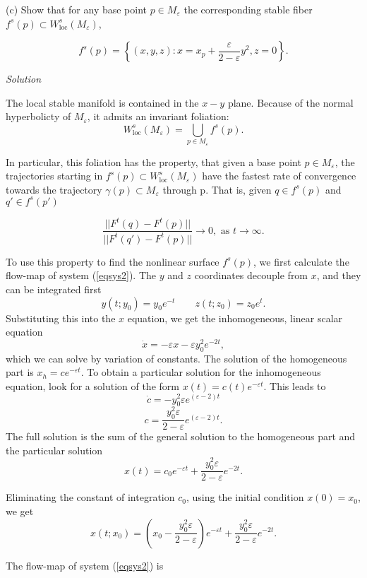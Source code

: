 \documentclass[a4paper,11pt,pdftex]{article}
\begin{document}
(c) Show that for any base point $p\in M_\varepsilon $ the corresponding stable fiber $f^s(p)\subset W^s_{\text{loc}}(M_\varepsilon)$, 

$$
f^s(p) = \left\{ (x,y,z): x = x_p+ \frac{\varepsilon}{2-\varepsilon}y^2, z=0 \right\}.
$$


\emph{Solution}

The local stable manifold is contained in the $x-y$ plane. Because of the normal hyperbolicty of $M_\varepsilon$, it admits an invariant foliation:
$$
W^s_{\text{loc}}(M_\varepsilon) = \bigcup_{p\in M_\varepsilon} f^s(p).
$$

In particular, this foliation has the property, that given a base point $p\in M_\varepsilon$, the trajectories starting in $f^s(p)\subset W^s_{\text{loc}}(M_\varepsilon) $ have the fastest rate of convergence towards the trajectory $\gamma(p)\subset M_\varepsilon$ through p. That is, given $q\in f^s(p)$ and $q'\in f^s(p')$

\begin{equation}
\label{conds}
    \frac{||F^t(q) - F^t(p)||}{||F^t(q') - F^t(p)||}\to 0, \text{ as } t\to \infty.
\end{equation}

To use this property to find the nonlinear surface $f^s(p)$, we first calculate the flow-map of system (\ref{eqsys2}). The $y$ and $z$ coordinates decouple from $x$, and they can be integrated first
$$
y(t;y_0) = y_0e^{-t} \qquad z(t;z_0) = z_0e^{t}.
$$
Substituting this into the $x$ equation, we get the inhomogeneous, linear scalar equation
$$
    \dot{x} = -\varepsilon x - \varepsilon y_0^2 e^{-2t}, 
$$
which we can solve by variation of constants. The solution of the homogeneous part is $x_h = ce^{-\varepsilon t}$. To obtain a particular solution for the inhomogeneous equation, look for a solution of the form $x(t)=c(t)e^{-\varepsilon t}$. This leads to
$$
\dot{c} = -y_0^2\varepsilon e^{(\varepsilon-2)t}
$$
$$
c = \frac{y_0^2 \varepsilon }{2-\varepsilon}e^{(\varepsilon-2)t}.
$$
The full solution is the sum of the general solution to the homogeneous part and the particular solution
$$
x(t) = c_0e^{-\varepsilon t} + \frac{y_0^2 \varepsilon }{2-\varepsilon}e^{-2t}.
$$

Eliminating the constant of integration $c_0$, using the initial condition $x(0) = x_0$, we get
$$
x(t;x_0) = \left(x_0 - \frac{y_0^2 \varepsilon }{2-\varepsilon}\right)e^{-\varepsilon t} + \frac{y_0^2\varepsilon}{2-\varepsilon}e^{-2t}.
$$

The flow-map of system (\ref{eqsys2}) is 
\end{document}
